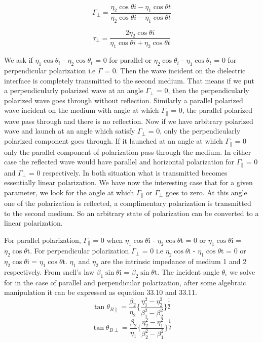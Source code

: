 \begin{equation}
\Gamma_\perp = \dfrac{\eta_2\cos\textit{$\theta$i} - \eta_1\cos\textit{$\theta$t}}  {\eta_2\cos\textit{$\theta$i} - \eta_1\cos\textit{$\theta$t}}
\end{equation}

\begin{equation}
\tau_\perp = \dfrac{2\eta_2\cos\textit{$\theta$i}} {\eta_1\cos\textit{$\theta$i} + \eta_2\cos\textit{$\theta$t}}
\end{equation}

We ask if $\eta_1\cos\theta_{\textit{i}}$ - $\eta_2\cos\theta_{\textit{t}}$ = 0  for parallel or $\eta_2\cos\theta_{\textit{i}}$ - $\eta_1\cos\theta_{\textit{t}}$ = 0 for perpendicular polarization i.e $\Gamma$ = 0. Then the wave incident on the dielectric interface is completely transmitted to the second medium. That means if we put a perpendicularly polarized wave at an angle $\Gamma_\perp$ = 0, then the perpendicularly polarized wave goes through without reflection. Similarly a parallel polarized wave incident on  the medium with angle at which $\Gamma_{\parallel}$ = 0, the parallel polarized wave pass through and there is no reflection.
Now if we have arbitrary polarized wave and launch at an angle which satisfy $\Gamma_\perp$ = 0, only the perpendicularly polarized component goes through. If it launched at an angle at which $\Gamma_\parallel$ = 0 only the parallel component of polarization pass through the medium. In either case the reflected wave would have parallel and horizontal polarization for $\Gamma_\parallel$ = 0 and $\Gamma_\perp$ = 0 respectively. In both situation what is transmitted becomes essentially linear polarization. We have now the interesting case that for a given parameter, we look for the angle at which $\Gamma_\parallel$ or $\Gamma_\perp$ goes to zero. At this angle one of the polarization is reflected, a complimentary polarization is transmitted to the second medium. So an arbitrary state of polarization can be converted to a linear polarization.

For parallel polarization, $\Gamma_\parallel$ = 0 when $\eta_1\cos\theta$i - $\eta_2\cos\theta$t = 0 or $\eta_1\cos\theta$i = $\eta_2\cos\theta$t. For perpendicular polarization $\Gamma_\perp$ = 0 i.e $\eta_2\cos\theta$i - $\eta_1\cos\theta$t = 0 or $\eta_2\cos\theta$i = $\eta_1\cos\theta$t. $\eta_1$ and $\eta_2$ are the intrinsic impedance of medium 1 and 2 respectively. From snell's law $\beta_1\sin\theta$i = $\beta_2\sin\theta$t. The incident angle $\theta_i$ we solve for in the case of parallel and perpendicular polarization, after some algebraic manipulation it can be expressed as equation 33.10 and 33.11. 
\begin{equation}
\tan\theta_{B\parallel} = \dfrac{\beta_2}{\eta_2} \Bigg\{ \dfrac{\eta_1 ^2 - \eta_2 ^2}{\beta_1 ^2 - \beta_2 ^2} \Bigg\}^{\dfrac{1}{2}}
\end{equation}
\begin{equation}
\tan\theta_{B\perp} = \dfrac{\beta_2}{\eta_1} \Bigg\{ \dfrac{\eta_2 ^2 - \eta_1 ^2}{\beta_2 ^2 - \beta_1 ^2} \Bigg\}^{\dfrac{1}{2}}
\end{equation}

